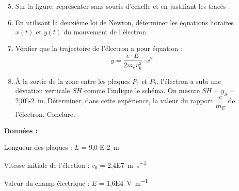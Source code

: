 \documentclass[a4paper,11pt,fleqn]{article}%
\begin{document}
\begin{enumerate}
\setcounter{enumi}{4}
	\item Sur la figure, représenter sans soucis d'échelle et en justifiant les tracés :
 	\item En utilisant la deuxième loi de Newton, déterminer les équations horaires $x(t)$ et $y(t)$ du mouvement de l'électron.
 	\item Vérifier que la trajectoire de l'électron a pour équation : 
 	$$y = \dfrac{e \cdot E}{2 m_e v_0^2} \cdot x^2$$
 	\item À la sortie de la zone entre les plaques $P_1$ et $P_2$, l'électron a subi une déviation verticale $SH$ comme l'indique le schéma. On mesure $SH = y_S$ = \SI{2,0E-2}{m}. Déterminer, dans cette expérience, la valeur du rapport $\dfrac{e}{m_E}$ de l'électron. Conclure.
\end{enumerate}
\textbf{Données :}
\begin{itemize*}
	\item Longueur des plaques : $L$ = \SI{9,0 E-2}{m}
	\item Vitesse initiale de l'élection : $v_0$ = \SI{2,4E7}{\meter\per\second}
	\item Valeur du champ électrique : $E$ = \SI{1,6E4}{\volt\per\meter}
\end{itemize*}


  
\end{document}
